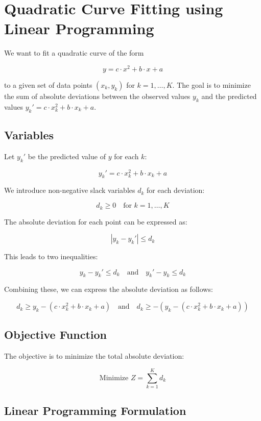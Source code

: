 \documentclass{article}
\begin{document}
\section*{Quadratic Curve Fitting using Linear Programming}

We want to fit a quadratic curve of the form 

\[
y = c \cdot x^2 + b \cdot x + a
\]

to a given set of data points \((x_k, y_k)\) for \(k = 1, \ldots, K\). The goal is to minimize the sum of absolute deviations between the observed values \(y_k\) and the predicted values \(y_k' = c \cdot x_k^2 + b \cdot x_k + a\).

\subsection*{Variables}

Let \(y_k'\) be the predicted value of \(y\) for each \(k\):

\[
y_k' = c \cdot x_k^2 + b \cdot x_k + a
\]

We introduce non-negative slack variables \(d_k\) for each deviation:

\[
d_k \geq 0 \quad \text{for } k = 1, \ldots, K
\]

The absolute deviation for each point can be expressed as:

\[
|y_k - y_k'| \leq d_k
\]

This leads to two inequalities:

\[
y_k - y_k' \leq d_k \quad \text{and} \quad y_k' - y_k \leq d_k
\]

Combining these, we can express the absolute deviation as follows:

\[
d_k \geq y_k - (c \cdot x_k^2 + b \cdot x_k + a) \quad \text{and} \quad d_k \geq -(y_k - (c \cdot x_k^2 + b \cdot x_k + a))
\]

\subsection*{Objective Function}

The objective is to minimize the total absolute deviation:

\[
\text{Minimize } Z = \sum_{k=1}^{K} d_k
\]

\subsection*{Linear Programming Formulation}
\end{document}
